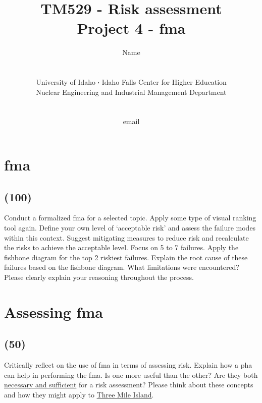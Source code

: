 \documentclass[11pt,a4paper]{article}
\newcommand*\sq{\mathbin{\vcenter{\hbox{\rule{.3ex}{.3ex}}}}} %
\newcommand{\acl}{\acrlong} %
\newcommand{\acs}{\acrshort} %
\begin{document}
\begin{titlepage}
    \title{
        TM529 - Risk assessment\\
        Project 4 - \acl{fma}\\
    }
    \author{
        Name
        \\ \\ \\
        University of Idaho $\sq$ Idaho Falls Center for Higher Education\\
        Nuclear Engineering and Industrial Management Department
        \\ \\ \\
        email 
    }
\clearpage %
\maketitle
\vspace*{\fill}
\thispagestyle{empty} %
\end{titlepage}


\section{\acl{fma}}
\subsection*{(100)}
Conduct a formalized \acs{fma} for a selected topic. Apply some type of visual ranking tool again. Define your own level of `acceptable risk' and assess the failure modes within this context. Suggest mitigating measures to reduce risk and recalculate the risks to achieve the acceptable level. Focus on 5 to 7 failures. Apply the fishbone diagram for the top 2 riskiest failures. Explain the root cause of these failures based on the fishbone diagram. What limitations were encountered? Please clearly explain your reasoning throughout the process.
    
        
        
        
        
\newpage     

\section{Assessing \acs{fma}}
\subsection*{(50)}
Critically reflect on the use of \acs{fma} in terms of assessing risk. Explain how a \acs{pha} can help in performing the \acs{fma}. Is one more useful than the other? Are they both \href{https://en.wikipedia.org/wiki/Necessity_and_sufficiency}{necessary and sufficient} for a risk assessment? Please think about these concepts and how they might apply to \href{https://www.ans.org/pubs/magazines/download/article-1151/}{Three Mile Island}.
       
\end{document}
